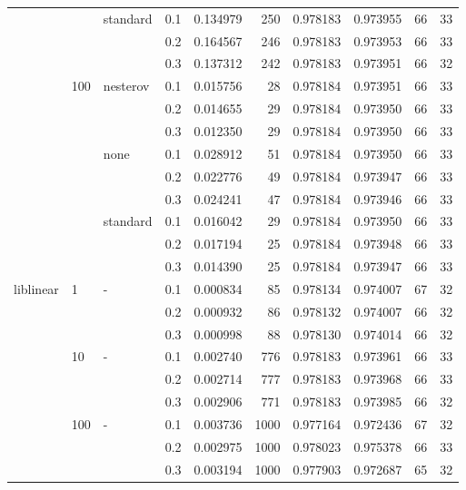 \begin{table}[H]
\begin{tabular}{llllrrrrrr}
          &     & standard & 0.1 &  0.134979 &     250 &  0.978183 &  0.973955 &          66 &        33 \\
          &     &   & 0.2 &  0.164567 &     246 &  0.978183 &  0.973953 &          66 &        33 \\
          &     &   & 0.3 &  0.137312 &     242 &  0.978183 &  0.973951 &          66 &        32 \\
          & 100 & nesterov & 0.1 &  0.015756 &      28 &  0.978184 &  0.973951 &          66 &        33 \\
          &     &   & 0.2 &  0.014655 &      29 &  0.978184 &  0.973950 &          66 &        33 \\
          &     &   & 0.3 &  0.012350 &      29 &  0.978184 &  0.973950 &          66 &        33 \\
          &     & none & 0.1 &  0.028912 &      51 &  0.978184 &  0.973950 &          66 &        33 \\
          &     &   & 0.2 &  0.022776 &      49 &  0.978184 &  0.973947 &          66 &        33 \\
          &     &   & 0.3 &  0.024241 &      47 &  0.978184 &  0.973946 &          66 &        33 \\
          &     & standard & 0.1 &  0.016042 &      29 &  0.978184 &  0.973950 &          66 &        33 \\
          &     &   & 0.2 &  0.017194 &      25 &  0.978184 &  0.973948 &          66 &        33 \\
          &     &   & 0.3 &  0.014390 &      25 &  0.978184 &  0.973947 &          66 &        33 \\
liblinear & 1   & - & 0.1 &  0.000834 &      85 &  0.978134 &  0.974007 &          67 &        32 \\
          &     &   & 0.2 &  0.000932 &      86 &  0.978132 &  0.974007 &          66 &        32 \\
          &     &   & 0.3 &  0.000998 &      88 &  0.978130 &  0.974014 &          66 &        32 \\
          & 10  & - & 0.1 &  0.002740 &     776 &  0.978183 &  0.973961 &          66 &        33 \\
          &     &   & 0.2 &  0.002714 &     777 &  0.978183 &  0.973968 &          66 &        33 \\
          &     &   & 0.3 &  0.002906 &     771 &  0.978183 &  0.973985 &          66 &        32 \\
          & 100 & - & 0.1 &  0.003736 &    1000 &  0.977164 &  0.972436 &          67 &        32 \\
          &     &   & 0.2 &  0.002975 &    1000 &  0.978023 &  0.975378 &          66 &        33 \\
          &     &   & 0.3 &  0.003194 &    1000 &  0.977903 &  0.972687 &          65 &        32 \\
\bottomrule
\end{tabular}
\end{table}
